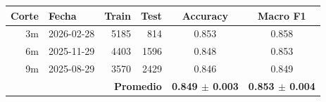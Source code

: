 \begin{tabular}{rlrrcc}
\toprule
\textbf{Corte} & \textbf{Fecha} & \textbf{Train} & \textbf{Test} & \textbf{Accuracy} & \textbf{Macro F1} \\
\midrule
3m & 2026-02-28 & 5185 & 814 & 0.853 & 0.858 \\
6m & 2025-11-29 & 4403 & 1596 & 0.848 & 0.853 \\
9m & 2025-08-29 & 3570 & 2429 & 0.846 & 0.849 \\
\midrule
\multicolumn{4}{r}{\textbf{Promedio}} & \textbf{0.849 $\pm$ 0.003} & \textbf{0.853 $\pm$ 0.004} \\
\bottomrule
\end{tabular}
